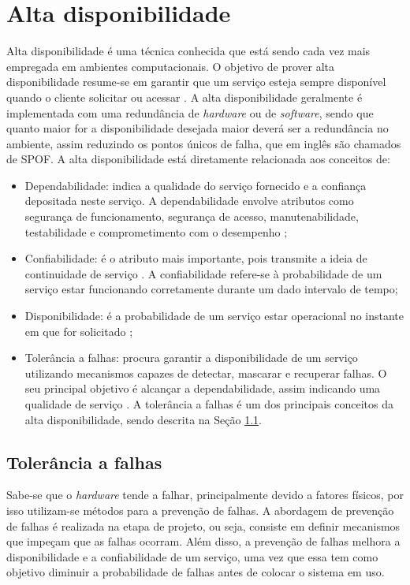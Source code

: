 \chapter{Alta disponibilidade}
\label{cap:altadisponibilidade}

Alta disponibilidade é uma técnica conhecida que está sendo cada vez mais empregada em ambientes computacionais. O objetivo de prover
alta disponibilidade resume-se em garantir que um serviço esteja sempre disponível quando o cliente solicitar ou acessar \cite{costa2009}.
A alta disponibilidade geralmente é implementada com uma redundância de \textit{hardware} ou de \textit{software}, sendo que quanto maior for 
a disponibilidade desejada maior deverá ser a redundância no ambiente, assim reduzindo os pontos únicos de falha, que em inglês são chamados 
de \ac{SPOF}. A alta disponibilidade está diretamente relacionada aos conceitos de: 
\begin{itemize}
 \item Dependabilidade: indica a qualidade do serviço fornecido e a confiança depositada neste serviço. A dependabilidade envolve atributos 
 como segurança de funcionamento, segurança de acesso, manutenabilidade, testabilidade e comprometimento com o desempenho \cite{weber2002};
 \item Confiabilidade: é o atributo mais importante, pois transmite a ideia de continuidade de serviço \cite{pankaj1994}. A confiabilidade 
 refere-se à probabilidade de um serviço estar funcionando corretamente durante um dado intervalo de tempo;
 \item Disponibilidade: é a probabilidade de um serviço estar operacional no instante em que for solicitado \cite{costa2009};
 \item Tolerância a falhas: procura garantir a disponibilidade de um serviço utilizando mecanismos capazes de detectar, mascarar e recuperar 
 falhas. O seu principal objetivo é alcançar a dependabilidade, assim indicando uma qualidade de serviço \cite{costa2009}. A tolerância a 
 falhas é um dos principais conceitos da alta disponibilidade, sendo descrita na Seção \ref{section:toleranciafalhas}.
\end{itemize}

\section{Tolerância a falhas}
\label{section:toleranciafalhas}

Sabe-se que o \textit{hardware} tende a falhar, principalmente devido a fatores físicos, por isso utilizam-se métodos para a prevenção 
de falhas. A abordagem de prevenção de falhas é realizada na etapa de projeto, ou seja, consiste em definir mecanismos que impeçam que 
as falhas ocorram. Além disso, a prevenção de falhas melhora a disponibilidade e a confiabilidade de um serviço, uma vez que essa 
tem como objetivo diminuir a probabilidade de falhas antes de colocar o sistema em uso.

